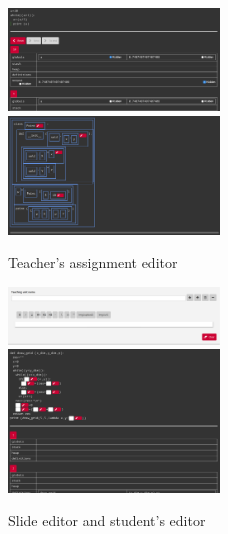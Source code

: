 \begin{figure}[!h]
	\includegraphics[width=0.5\textwidth]{Figures/forward_assignment}
	\includegraphics[width=0.5\textwidth]{Figures/backward_assignment}
	\caption{Teacher's assignment editor}
	\label{fig:assignment_editor}
\end{figure}

\begin{figure}[!h]
	\includegraphics[width=0.5\textwidth]{Figures/slide_editor}
	\includegraphics[width=0.5\textwidth]{Figures/forward_assignment_student}
	\caption{Slide editor and student's editor}
	\label{fig:slide_editor_student_editor}
\end{figure}

